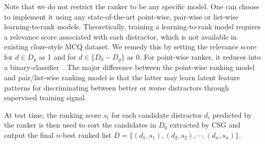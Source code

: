 Note that we do not restrict the ranker to be any specific model. 
One can choose to implement it using any state-of-the-art point-wise, 
pair-wise or list-wise learning-to-rank models. Theoretically, 
training a learning-to-rank model requires a relevance score associated with 
each distractor, which is not available in existing cloze-style 
MCQ dataset. We remedy this by setting the relevance score for $d\in D_g$ as 1 
and for $d\in \{D_0-D_g\}$ as 0. For point-wise ranker, 
it reduces into a binary-classifier~\cite{liang2018distractor}. 
The major difference between the point-wise ranking model and 
pair/list-wise ranking model is that the latter may learn latent 
feature patterns for discriminating between better or worse distractors 
through supervised training signal.


At test time, the ranking score $s_i$ for each candidate distractor $d_i$ 
predicted by the ranker is then used to sort the candidates in 
$D_0$ extracted by CSG and output the final $n$-best ranked list 
$D = \{(d_1, s_1), (d_2, s_2), \cdots, (d_n, s_n) \}$.

